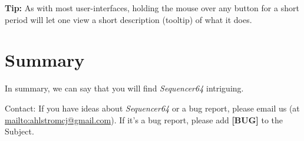 \documentclass[
 11pt,
 twoside,
 a4paper,
 headinclude,
 footinclude,
 final                                 %
]{article}
\begin{document}
   \textbf{Tip:}
   As with most user-interfaces, holding the mouse over any button for a
   short period will let one view a short description (tooltip)
   of what it does.






































\section{Summary}
\label{sec:summary}

   In summary, we can say that you will find \textsl{Sequencer64} intriguing.

   Contact: If you have ideas about \textsl{Sequencer64} or a bug report, please
   email us (at \url{mailto:ahlstromcj@gmail.com}).
   If it's a bug report, please add \textbf{[BUG]} to the Subject.




\printindex
\end{document}
